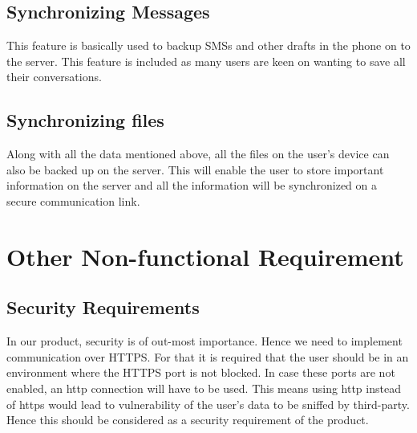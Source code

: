 \subsection{Synchronizing Messages}
\hspace*{0.82cm}This feature is basically used to backup SMSs and other drafts in the phone on to the server.
This feature is included as many users are keen on wanting to save all their conversations.

\subsection{Synchronizing files}
\hspace*{0.82cm}Along with all the data mentioned above, all the files on the user’s device can also be backed
up on the server. This will enable the user to store important information on the server and all the
information will be synchronized on a secure communication link.

\section{Other Non-functional Requirement}
\subsection{Security Requirements}
\hspace*{0.82cm}In our product, security is of out-most importance. Hence we need to implement
communication over HTTPS. For that it is required that the user should be in an environment where
the HTTPS port is not blocked. In case these ports are not enabled, an http connection will have to be
used. This means using http instead of https would lead to vulnerability of the user’s data to be sniffed
by third-party. Hence this should be considered as a security requirement of the product.
